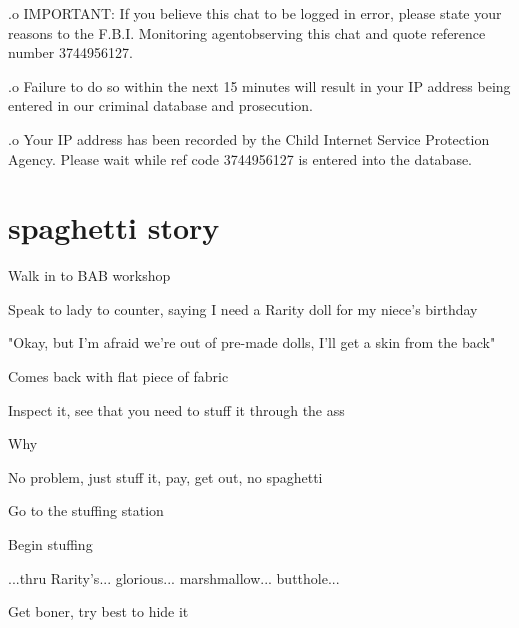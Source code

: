 \documentclass[a1paper]{article}
\begin{document}
\begin{multicols}{7}
{.o IMPORTANT: If you believe this chat to be logged in error, please state your reasons to the F.B.I. Monitoring agentobserving this chat and quote reference number 3744956127.

.o Failure to do so within the next 15 minutes will result in your IP address being entered in our criminal database and prosecution. 

.o Your IP address has been recorded by the Child Internet Service Protection Agency. Please wait while ref code 3744956127 is entered into the database.












\section{spaghetti story}
\setlength{\parskip}{0.0em}


\textrangle \hspace{0.1em} Walk in to BAB workshop

\textrangle \hspace{0.1em} Speak to lady to counter, saying I need a Rarity doll for my niece's birthday

\textrangle \hspace{0.1em} "Okay, but I'm afraid we're out of pre-made dolls, I'll get a skin from the back"

\textrangle \hspace{0.1em} Comes back with flat piece of fabric

\textrangle \hspace{0.1em} Inspect it, see that you need to stuff it through the ass

\textrangle \hspace{0.1em} Why

\textrangle \hspace{0.1em} No problem, just stuff it, pay, get out, no spaghetti

\textrangle \hspace{0.1em} Go to the stuffing station

\textrangle \hspace{0.1em} Begin stuffing

\textrangle \hspace{0.1em} ...thru Rarity's... glorious... marshmallow... butthole...

\textrangle \hspace{0.1em} Get boner, try best to hide it

}
\end{multicols}
\end{document}
